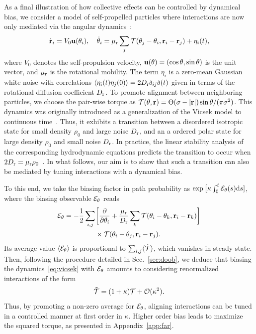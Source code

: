 \documentclass[superscriptaddress, twocolumn, prx, longbibliography, nofootinbib]{revtex4-1}
\providecommand{\DIFaddbegin}{} %
\providecommand{\DIFaddend}{} %
\providecommand{\DIFdelend}{} %
\begin{document}
\DIFdelend \DIFaddbegin \label{secsec:viscek}
\DIFaddend As a final illustration of how collective effects can be controlled by dynamical bias, we consider a model of self-propelled particles where interactions are now only mediated via the angular dynamics~\cite{Farrell2012}:
\begin{equation}\label{eq:vicsek}
	\dot{\bf r}_i= V_0 {\bf u}(\theta_i),
	\quad
	\dot\theta_i = \mu_{\rm r} \sum_j {\cal T}(\theta_j-\theta_i, {\bf r}_i-{\bf r}_j) + \eta_i(t) ,
\end{equation}
where $V_0$ denotes the self-propulsion velocity, ${\bf u}(\theta) = (\cos\theta, \sin\theta)$ is the unit vector, and $\mu_{\rm r}$ is the rotational mobility. The term $\eta_i$ is a zero-mean Gaussian white noise with correlations $\langle\eta_i(t)\eta_j(0)\rangle = 2 D_{\rm r} \delta_{ij}\delta(t)$ given in terms of the rotational diffusion coefficient $D_{\rm r}$. To promote alignment between neighboring particles, we choose the pair-wise torque as ${\cal T}(\theta,{\bf r})=\Theta(\sigma-|{\bf r}|)\sin\theta/(\pi\sigma^2)$. This dynamics was originally introduced as a generalization of the Vicsek model to continuous time~\cite{Vicsek1995}. Thus, it exhibits a transition between a disordered isotropic state for small density $\rho_0$ and large noise $D_{\rm r}$, and an a ordered polar state for large density $\rho_0$ and small noise $D_{\rm r}$. In practice, the linear stability analysis of the corresponding hydrodynamic equations predicts the transition to occur when $2 D_{\rm r}=\mu_{\rm r}\rho_0$~\cite{Farrell2012}. In what follows, our aim is to show that such a transition can also be mediated by tuning interactions with a dynamical bias.


To this end, we take the biasing factor in path probability as $\exp\big[\kappa \int_0^t{\cal E}_\theta(s){\rm d}s]$, where the biasing observable ${\cal E}_\theta$ reads
\begin{equation}
	\begin{aligned}\label{eq:eps_theta}
		{\cal E}_\theta = - \frac{1}{2} \sum_{i,j}& \bigg[ \frac{\partial}{\partial\theta_i} + \frac{\mu_{\rm r}}{D_{\rm r}} \sum_k {\cal T}(\theta_i-\theta_k, {\bf r}_i-{\bf r}_k) \bigg]
		\\
		&\times{\cal T}(\theta_i-\theta_j, {\bf r}_i-{\bf r}_j) .
	\end{aligned}
\end{equation}
Its average value $\langle{\cal E}_\theta\rangle$ is proportional to $\sum_{i,j}\langle\dot {\cal T} \rangle$, which vanishes in steady state. Then, following the procedure detailed in Sec.~\ref{sec:doob}, we deduce that biasing the dynamics~\eqref{eq:vicsek} with ${\cal E}_\theta$ amounts to considering renormalized interactions of the form 
\begin{equation}\label{eq:torque}
	\tilde{\cal T} = (1+\kappa){\cal T} + {\cal O}(\kappa^2) .
\end{equation}
Thus, by promoting a non-zero average for ${\cal E}_\theta$, aligning interactions can be tuned in a controlled manner at first order in $\kappa$. Higher order bias leads to maximize the squared torque, as presented in Appendix~\ref{app:far}.
\end{document}
